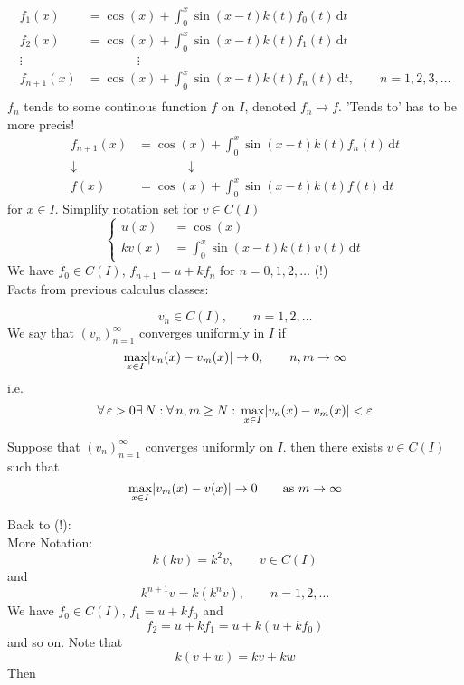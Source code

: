 \begin{enumerate}[1.]
	\begin{align*}
		f_1(x) &= \cos(x) + \int_{0}^{x}\sin(x-t)k(t)f_0(t) \,\mathrm{d}t \\
		f_2(x) &= \cos(x) + \int_{0}^{x}\sin(x-t)k(t)f_1(t) \,\mathrm{d}t \\
		\vdots &\qquad \qquad  \vdots \\
		f_{n+1}(x) &= \cos(x) + \int_{0}^{x}\sin(x-t)k(t)f_n(t) \,\mathrm{d}t, \qquad n=1,2,3, \dots \\
	\end{align*}
	 $f_n$ tends to some continous function $f$ on $I$, denoted $f_n \to f$. 'Tends to' has to be more precis! 
	\begin{align*}
		f_{n+1}(x) &= \cos(x) + \int_{0}^{x} \sin(x-t)k(t)f_n(t) \,\mathrm{d}t \\
		\downarrow & \qquad \qquad \downarrow \\
		f(x) &= \cos(x) + \int_{0}^{x} \sin(x-t)k(t)f(t) \,\mathrm{d}t
	\end{align*}
	for $x \in I$. Simplify notation set for $v \in C(I)$
	\[
		\begin{cases}
			u(x)&=\cos(x)\\
			kv(x)&= \int_{0}^{x} \sin(x-t)k(t)v(t) \,\mathrm{d}t
		\end{cases}
	\]
	We have $f_0 \in C(I)$, $f_{n+1}=u + k f_n$ for $n=0,1,2, \dots$ (!) \\
	Facts from previous calculus classes:
	\begin{definition*}
		\[
			v_n \in C(I), \qquad n=1,2,\dots
		\]
		We say that $(v_n)_{n=1}^{\infty}$ converges uniformly in $I$ if
		\[
			\max_{x \in I} \lvert v_n(x)-v_m(x)\rvert \to 0 , \qquad n,m \to \infty
		\]
		i.e.
		\[
			\forall\, \varepsilon >0 \exists\, N: \forall\, n,m \geq N: \, \max_{x \in I}\lvert v_n(x)-v_m(x)\rvert< \varepsilon
		\]
	\end{definition*}
	\begin{lemma*}
		Suppose that $(v_n)_{n=1}^{\infty}$ converges uniformly on $I$. then there exists $v \in C(I)$ such that
		\[
			 \max_{x \in I}\lvert v_m(x)-v(x)\rvert \to 0 \qquad \text{as }m \to \infty
		\]
	\end{lemma*}
	Back to (!): \\
	More Notation:
	\[
		k(kv) = k^2 v, \qquad v \in C(I)
	\]
	and
	\[
		k^{n+1}v = k(k^nv), \qquad n=1,2,\dots
	\]
	We have $f_0 \in C(I)$, $f_1=u+kf_0$ and 
	\[
		f_2 = u + kf_1 = u + k(u+kf_0)
	\]
	and so on. Note that
	\[
		k(v+w)=kv+kw
	\]
	Then 
	\begin{align*}

\end{align*}
\end{enumerate}
